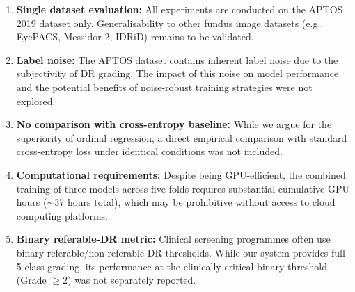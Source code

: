 \begin{enumerate}
    \item \textbf{Single dataset evaluation:} All experiments are conducted on the APTOS 2019 dataset only. Generalisability to other fundus image datasets (e.g., EyePACS, Messidor-2, IDRiD) remains to be validated.
    
    \item \textbf{Label noise:} The APTOS dataset contains inherent label noise due to the subjectivity of DR grading. The impact of this noise on model performance and the potential benefits of noise-robust training strategies were not explored.
    
    \item \textbf{No comparison with cross-entropy baseline:} While we argue for the superiority of ordinal regression, a direct empirical comparison with standard cross-entropy loss under identical conditions was not included.
    
    \item \textbf{Computational requirements:} Despite being GPU-efficient, the combined training of three models across five folds requires substantial cumulative GPU hours ($\sim$37 hours total), which may be prohibitive without access to cloud computing platforms.
    
    \item \textbf{Binary referable-DR metric:} Clinical screening programmes often use binary referable/non-referable DR thresholds. While our system provides full 5-class grading, its performance at the clinically critical binary threshold (Grade $\geq 2$) was not separately reported.
\end{enumerate}
